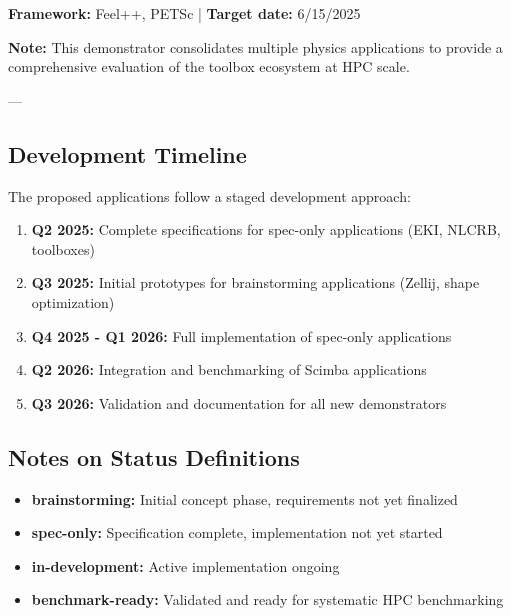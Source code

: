 \textbf{Framework:} Feel++, PETSc | \textbf{Target date:} 6/15/2025

\textbf{Note:} This demonstrator consolidates multiple physics applications to provide a comprehensive evaluation of the \Feelpp toolbox ecosystem at HPC scale.

---

\subsection{Development Timeline}

The proposed applications follow a staged development approach:

\begin{enumerate}
\item \textbf{Q2 2025:} Complete specifications for spec-only applications (EKI, NLCRB, toolboxes)
\item \textbf{Q3 2025:} Initial prototypes for brainstorming applications (Zellij, shape optimization)
\item \textbf{Q4 2025 - Q1 2026:} Full implementation of spec-only applications
\item \textbf{Q2 2026:} Integration and benchmarking of Scimba applications
\item \textbf{Q3 2026:} Validation and documentation for all new demonstrators
\end{enumerate}

\subsection{Notes on Status Definitions}

\begin{itemize}
\item \textbf{brainstorming:} Initial concept phase, requirements not yet finalized
\item \textbf{spec-only:} Specification complete, implementation not yet started
\item \textbf{in-development:} Active implementation ongoing
\item \textbf{benchmark-ready:} Validated and ready for systematic HPC benchmarking
\end{itemize}

